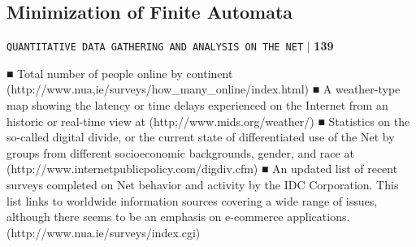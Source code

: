 \documentclass[a4,9pt]{beamer}
\begin{document}
\begin{frame}
\section*{Minimization of Finite Automata}
\begin{flushright}
 \texttt{QUANTITATIVE DATA GATHERING AND ANALYSIS ON THE NET} \hspace*{0.1cm}\textbf{$|$} \hspace*{0.1cm} \textbf{139}\hspace*{0.1cm}
\end{flushright}
\vspace*{1cm}
■ Total number of people online by continent (http://www.nua,ie/surveys/how_many_online/index.html)
■ A weather-type map showing the latency or time delays experienced on the Internet from an historic or real-time view at (http;//www.mids.org/weather/)
■ Statistics on the so-called digital divide, or the current state of differentiated use of the Net by groups from different socioeconomic backgrounds, gender, and race at (http://www.internetpublicpolicy.com/digdiv.cfm)
■ An updated list of recent surveys completed on Net behavior and activity by the IDC Corporation. This list links to worldwide information sources covering a wide range of issues, although there seems to be an emphasis on e-commerce applications. (http://www.nua.ie/surveys/index.cgi)

\end{frame}
\end{document}
